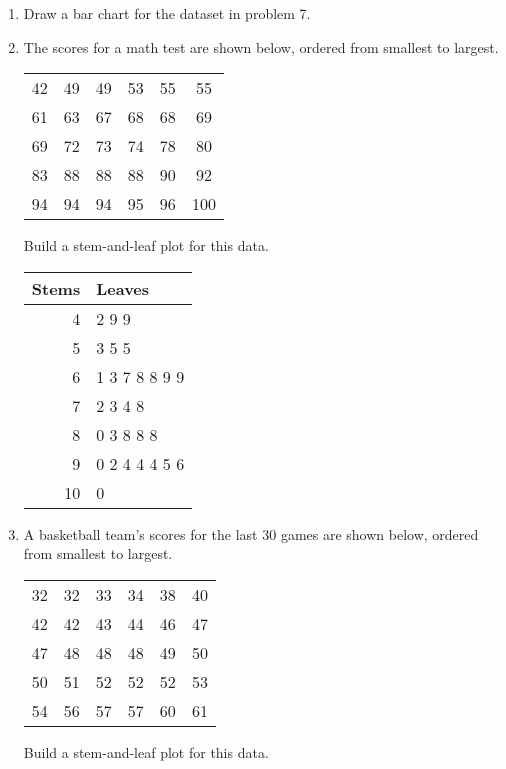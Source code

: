 \begin{enumerate}
\item Draw a bar chart for the dataset in problem 7.

\begin{center}
\end{center}
\pagebreak

\item The scores for a math test are shown below, ordered from smallest to largest.
\begin{center}
\begin{tabular}{c c c c c c}
42 & 49 & 49 & 53 & 55 & 55\\
61 & 63 & 67 & 68 & 68 & 69\\
69 & 72 & 73 & 74 & 78 & 80\\
83 & 88 & 88 & 88 & 90 & 92\\
94 & 94 & 94 & 95 & 96 & 100
\end{tabular}
\end{center}
Build a stem-and-leaf plot for this data.

\begin{center}
\begin{tabular}{r | l}
Stems & Leaves\\
\hline
4 & 2 9 9\\
5 & 3 5 5\\
6 & 1 3 7 8 8 9 9\\
7 & 2 3 4 8\\
8 & 0 3 8 8 8\\
9 & 0 2 4 4 4 5 6\\
10 & 0
\end{tabular}
\end{center}

\item A basketball team's scores for the last 30 games are shown below, ordered from smallest to largest.
\begin{center}
\begin{tabular}{c c c c c c}
32 & 32 & 33 & 34 & 38 & 40\\
42 & 42 & 43 & 44 & 46 & 47\\
47 & 48 & 48 & 48 & 49 & 50\\
50 & 51 & 52 & 52 & 52 & 53\\
54 & 56 & 57 & 57 & 60 & 61
\end{tabular}
\end{center}
Build a stem-and-leaf plot for this data.


\end{enumerate}
